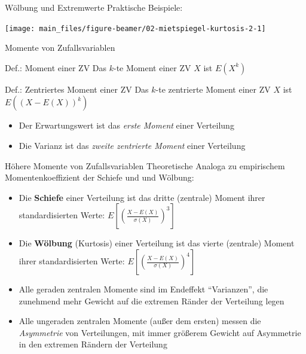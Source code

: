 \documentclass[
  10pt,
  ignorenonframetext,
]{beamer}
\providecommand{\tightlist}{%
  \setlength{\itemsep}{0pt}\setlength{\parskip}{0pt}}
\begin{document}
\begin{frame}{Wölbung und Extremwerte}
\label{wuxf6lbung-und-extremwerte-3}
Praktische Beispiele:

\scriptsize

\begin{center}\texttt{[image: main\_files/figure-beamer/02-mietspiegel-kurtosis-2-1]} \end{center}

\normalsize
\end{frame}

\begin{frame}{Momente von Zufallsvariablen}
\label{momente-von-zufallsvariablen}
\begin{block}{Def.: Moment einer ZV}
\label{def.-moment-einer-zv}
Das \(k\)-te Moment einer ZV \(X\) ist \(E(X^k)\)
\end{block}

\begin{block}{Def.: Zentriertes Moment einer ZV}
\label{def.-zentriertes-moment-einer-zv}
Das \(k\)-te zentrierte Moment einer ZV \(X\) ist
\(E\left((X-E(X))^k\right)\)
\end{block}

\begin{itemize}
\tightlist
\item
  Der Erwartungswert ist das \emph{erste Moment} einer Verteilung\\
\item
  Die Varianz ist das \emph{zweite zentrierte Moment} einer Verteilung
\end{itemize}
\end{frame}

\begin{frame}{Höhere Momente von Zufallsvariablen}
\label{huxf6here-momente-von-zufallsvariablen}
Theoretische Analoga zu empirischem Momentenkoeffizient der Schiefe und
und Wölbung:

\begin{itemize}
\item
  Die \textbf{Schiefe} einer Verteilung ist das dritte (zentrale) Moment
  ihrer standardisierten Werte:
  \(E\left[\left(\frac{X - E(X)}{\sigma(X)}\right)^3\right]\)
\item
  Die \textbf{Wölbung} (Kurtosis) einer Verteilung ist das vierte
  (zentrale) Moment ihrer standardisierten Werte:
  \(E\left[\left(\frac{X - E(X)}{\sigma(X)}\right)^4\right]\)
\item
  Alle geraden zentralen Momente sind im Endeffekt ``Varianzen'', die
  zunehmend mehr Gewicht auf die extremen Ränder der Verteilung legen
\item
  Alle ungeraden zentralen Momente (außer dem ersten) messen die
  \emph{Asymmetrie} von Verteilungen, mit immer größerem Gewicht auf
  Asymmetrie in den extremen Rändern der Verteilung
\end{itemize}
\end{frame}
\end{document}
